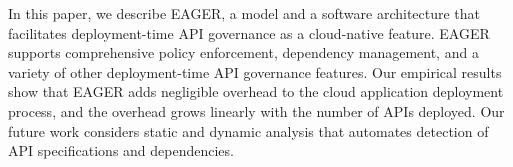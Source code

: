 In this paper, we describe EAGER, a model and a software architecture that 
facilitates deployment-time API governance as a cloud-native feature. EAGER supports comprehensive policy
enforcement, dependency management, and a variety of other deployment-time API
governance features.
Our empirical results 
show that EAGER adds negligible overhead to the cloud application 
deployment process, and the overhead grows linearly
with the number of APIs deployed.
Our future work considers static and dynamic analysis
that automates detection of API specifications and dependencies.
